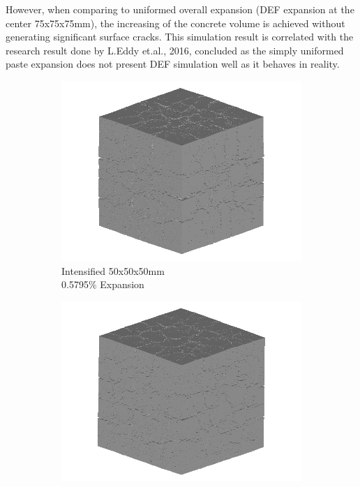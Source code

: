 However, when comparing to uniformed overall expansion (DEF expansion at the center 75x75x75mm), the increasing of the concrete volume is achieved without generating significant surface cracks. This simulation result is correlated with the research result done by L.Eddy et.al., 2016, concluded as the simply uniformed paste expansion does not present DEF simulation well as it behaves in reality.

\begin{figure}[ht!]
\centering
    \begin{subfigure}{.3\textwidth}
      \centering
      \includegraphics[width=.9\linewidth]{Files/exp_3D/DEF/A30X0C_3_3d.png}
    \caption{Intensified 50x50x50mm \\ 0.5795\% Expansion}
    \end{subfigure}%
    \begin{subfigure}{.3\textwidth}
      \centering
      \includegraphics[width=.9\linewidth]{Files/exp_3D/DEF/A30X-5C_3_3d.png}

\end{subfigure}
\end{figure}
